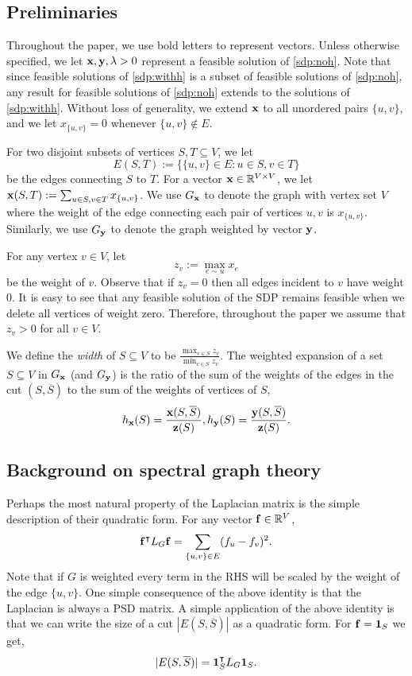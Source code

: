 \documentclass[11pt]{article}
\def\bone{{\bf 1}}
\def\bx{{\bf x}}
\def\by{{\bf y}}
\def\bz{{\bf z}}
\def\bof{{\bf f}}
\def\R{\mathbb{R}}
\begin{document}
\subsection{Preliminaries}
Throughout the paper, we use bold letters to represent vectors. 
Unless otherwise specified, we let $\bx,\by,\lambda>0$ 
represent a feasible solution of \ref{sdp:noh}. Note that since feasible solutions of \ref{sdp:withh} is a subset of feasible solutions of \ref{sdp:noh}, any result for feasible solutions of \ref{sdp:noh} extends to the solutions of \ref{sdp:withh}.
Without loss of generality, we extend $\bx$ to all unordered pairs $\{u,v\}$, and we let  $x_{\{u,v\}}=0$ whenever $\{u,v\}\notin E$.

For two disjoint subsets of vertices $S,T \subseteq V
$, we let 
$$E(S,T):=\{\{u,v\} \in E: u \in S, v \in T\}$$
be the edges connecting $S$ to $T$.
For a vector $\bx \in \R^{V\times V}$, we let  
$\bx(S,T):=\sum_{u\in S, v\in T} x_{\{u,v\}}$. 
We use $G_\bx$ to denote the  graph with vertex set $V$ where the weight of the edge connecting each pair of vertices $u,v$ is $x_{\{u,v\}}$.
Similarly, we use $G_\by$ to denote the graph weighted by vector $\by$. 

For any vertex $v \in V$, let  
$$z_v:=\max_{e \sim u} x_e$$
be the weight of $v$.
Observe that if $z_v=0$ then all edges incident to $v$ have weight $0$. It is easy to see that any feasible solution of the SDP remains feasible when we delete all vertices of weight zero.
Therefore, throughout the paper we assume that $z_v>0$ for all $v\in V$.

We define the \emph{width} of $S \subseteq V$ to be $\frac{\max_{v \in S} z_v}{\min_{v \in S}z_v}$. 
The weighted expansion of a set $S\subseteq V$ in $G_\bx$ (and $G_\by$) is the ratio of the sum of the weights of the edges in the cut $(S,\overline{S})$ to the sum of the 
weights of vertices of $S$,
$$ h_\bx(S) = \frac{\bx(S,\overline{S})}{\bz(S)}, h_\by(S)=\frac{\by(S,\overline{S})}{\bz(S)}.$$

\subsection{Background on spectral graph theory}
\label{sec:spectralgraphtheory}
Perhaps the most natural property 	of the Laplacian matrix is the simple description of their quadratic form. For any vector $\bof \in \R^V$, 
\begin{equation*}
\bof^\intercal L_G\bof = \sum_{\{u,v\} \in E} (f_u-f_v)^2.
\end{equation*}
Note that if $G$ is weighted every term in the RHS will be scaled by the weight of the edge $\{u,v\}$.
One simple consequence of the above identity is that the Laplacian is always a PSD matrix. 
A simple application of the above identity is that we can write the size of a cut $|E(S,\overline{S})|$ as a quadratic form. For $\bof=\bone_S$ we get,  
$$
|E(S,\overline{S})|=\bone_S^\intercal L_G \bone_S. 
$$ 
\end{document}
